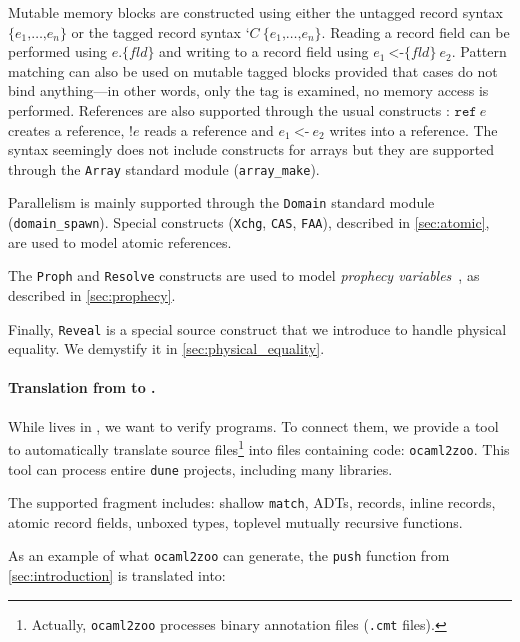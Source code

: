 Mutable memory blocks are constructed using either the untagged record syntax $\texttt{\{} e_1 \texttt{,} \dots \texttt{,} e_n \texttt{\}}$ or the tagged record syntax $\texttt{‘} C\ \texttt{\{} e_1 \texttt{,} \dots \texttt{,} e_n \texttt{\}}$.
Reading a record field can be performed using $e \texttt{.\{} \mathit{fld} \texttt{\}}$ and writing to a record field using $e_1\ \texttt{<-\{} \mathit{fld} \texttt{\}}\ e_2$.
Pattern matching can also be used on mutable tagged blocks provided that cases do not bind anything---in other words, only the tag is examined, no memory access is performed.
References are also supported through the usual constructs : $\texttt{ref}\ e$ creates a reference, $\texttt{!} e$ reads a reference and $e_1\ \texttt{<-}\ e_2$ writes into a reference.
The syntax seemingly does not include constructs for arrays but they are supported through the \texttt{Array} standard module (\eg \texttt{array\_make}).

Parallelism is mainly supported through the \texttt{Domain} standard module (\eg \texttt{domain\_spawn}).
Special constructs (\texttt{Xchg}, \texttt{CAS}, \texttt{FAA}), described in \cref{sec:atomic}, are used to model atomic references.

The \texttt{Proph} and \texttt{Resolve} constructs are used to model \emph{prophecy variables}~\cite{DBLP:journals/pacmpl/JungLPRTDJ20}, as described in \cref{sec:prophecy}.

Finally, \texttt{Reveal} is a special source construct that we introduce to handle physical equality.
We demystify it in \cref{sec:physical_equality}.

\paragraph{Translation from \OCaml to \ZooLang.}

While \ZooLang lives in \Coq, we want to verify \OCaml programs.
To connect them, we provide a tool to automatically translate \OCaml source files\footnote{Actually, \texttt{ocaml2zoo} processes binary annotation files (\texttt{.cmt} files).} into \Coq files containing \ZooLang code: \texttt{ocaml2zoo}.
This tool can process entire \texttt{dune} projects, including many libraries.

The supported \OCaml fragment includes: shallow \texttt{match}, ADTs, records, inline records, atomic record fields, unboxed types, toplevel mutually recursive functions.

As an example of what \texttt{ocaml2zoo} can generate, the \texttt{push} function from \cref{sec:introduction} is translated into:

